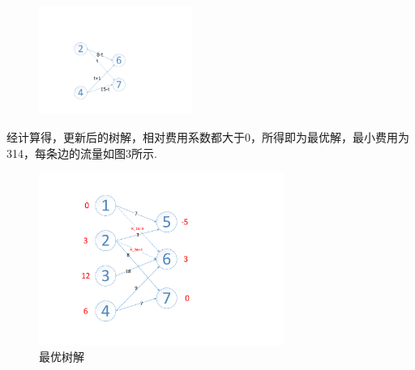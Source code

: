\documentclass[UTF8]{ctexart}
\begin{document}
\begin{enumerate}
\begin{enumerate}
\begin{figure}[H]
\small
\centering
\includegraphics[width=5cm]{6.pdf}
\end{figure}

经计算得，更新后的树解，相对费用系数都大于0，所得即为最优解，最小费用为314，每条边的流量如图3所示.

\begin{figure}[H]
\small
\centering
\includegraphics[width=8cm]{9.pdf}
\caption{最优树解}
\end{figure}
\end{enumerate}
\end{enumerate}
\end{document}
